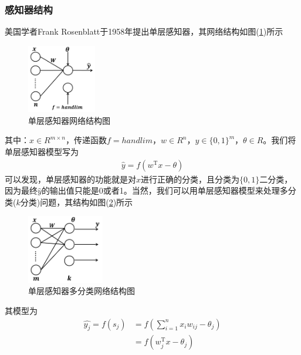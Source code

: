         \subsubsection{感知器结构}
            \par
            美国学者Frank Rosenblatt于1958年提出单层感知器，其网络结构如图(\ref{fig:单层感知器网络结构图})所示
            \begin{figure}[H]
            \centering
            \includegraphics[height=3cm]{images/single_layer_sensor_net_structure.jpg}
            \caption{单层感知器网络结构图}
            \label{fig:单层感知器网络结构图}
            \end{figure}
                其中：$x\in R^{m\times n}$，传递函数$f = handlim$，$w\in R^n$，$y\in \{0,1\}^m$，$\theta\in R$。我们将单层感知器模型写为
                \begin{align*}
                \hat{y} = f(w^\mathrm{T}x - \theta)
                \end{align*}
                可以发现，单层感知器的功能就是对$x$进行正确的分类，且分类为$\{0,1\}$二分类，因为最终$\hat{y}$的输出值只能是0或者1。当然，我们可以用单层感知器模型来处理多分类($k$分类)问题，其结构如图(\ref{fig:单层感知器多分类网络结构图})所示
            \begin{figure}[H]
            \centering
            \includegraphics[height=3cm]{images/single_layer_sensor_multiple_classify_net_structure.jpg}
            \caption{单层感知器多分类网络结构图}
            \label{fig:单层感知器多分类网络结构图}
            \end{figure}
                其模型为
                \begin{align*}
                \hat{y_j} = f(s_j) &= f \left( \sum_{i=1}^n x_i w_{ij} - \theta_j \right) \\
                &=f(w_j^\mathrm{T}x-\theta_j)
                \end{align*}
